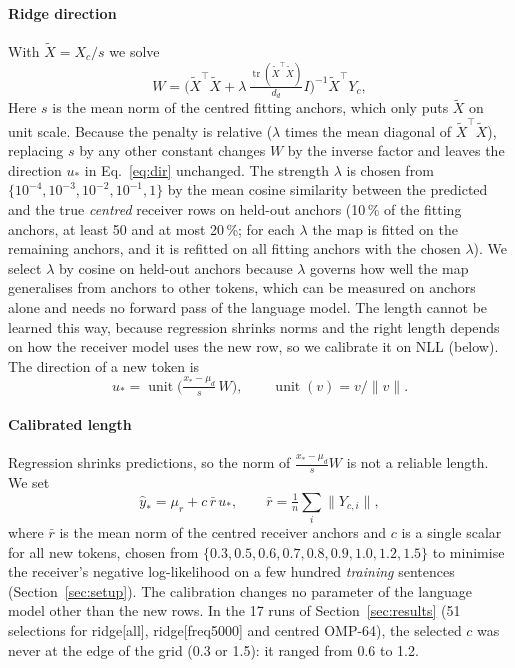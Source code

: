 \documentclass[preprint,12pt]{elsarticle}
\DeclareMathOperator{\dirn}{unit}
\DeclareMathOperator{\tr}{tr}
\begin{document}
\paragraph{Ridge direction} With $\tilde X=X_c/s$ we solve
\begin{equation}
W=\bigl(\tilde X^\top\tilde X+\lambda\,\tfrac{\tr(\tilde X^\top\tilde X)}{d_d}I\bigr)^{-1}\tilde X^\top Y_c ,
\label{eq:ridge}
\end{equation}
Here $s$ is the mean norm of the centred fitting anchors, which only puts $\tilde X$ on unit scale. Because the penalty is relative ($\lambda$ times the mean diagonal of $\tilde X^\top\tilde X$), replacing $s$ by any other constant changes $W$ by the inverse factor and leaves the direction $u_*$ in Eq.~\eqref{eq:dir} unchanged. The strength $\lambda$ is chosen from $\{10^{-4},10^{-3},10^{-2},10^{-1},1\}$ by the mean cosine similarity between the predicted and the true \emph{centred} receiver rows on held-out anchors (10\,\% of the fitting anchors, at least 50 and at most 20\,\%; for each $\lambda$ the map is fitted on the remaining anchors, and it is refitted on all fitting anchors with the chosen $\lambda$). We select $\lambda$ by cosine on held-out anchors because $\lambda$ governs how well the map generalises from anchors to other tokens, which can be measured on anchors alone and needs no forward pass of the language model. The length cannot be learned this way, because regression shrinks norms and the right length depends on how the receiver model uses the new row, so we calibrate it on NLL (below). The direction of a new token is
\begin{equation}
u_*=\dirn\!\bigl(\tfrac{x_*-\mu_d}{s}\,W\bigr),\qquad \dirn(v)=v/\|v\|.
\label{eq:dir}
\end{equation}

\paragraph{Calibrated length} Regression shrinks predictions, so the norm of $\tfrac{x_*-\mu_d}{s}W$ is not a reliable length. We set
\begin{equation}
\hat y_*=\mu_r+c\,\bar r\,u_*,\qquad \bar r=\tfrac1n\sum_i\|Y_{c,i}\|,
\label{eq:row}
\end{equation}
where $\bar r$ is the mean norm of the centred receiver anchors and $c$ is a single scalar for all new tokens, chosen from $\{0.3,0.5,0.6,0.7,0.8,0.9,1.0,1.2,1.5\}$ to minimise the receiver's negative log-likelihood on a few hundred \emph{training} sentences (Section~\ref{sec:setup}). The calibration changes no parameter of the language model other than the new rows. In the 17 runs of Section~\ref{sec:results} (51 selections for ridge[all], ridge[freq5000] and centred OMP-64), the selected $c$ was never at the edge of the grid (0.3 or 1.5): it ranged from 0.6 to 1.2.
\end{document}
